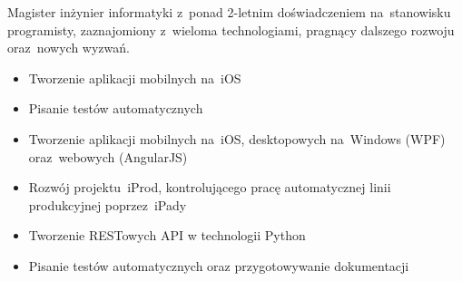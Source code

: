 \documentclass[11pt,a4paper]{article}
\begin{document}
    \bigskip

  
    \smallskip

    \noindent
    Magister inżynier informatyki z~ponad 2-letnim doświadczeniem na~stanowisku programisty, zaznajomiony z~wieloma technologiami, pragnący dalszego rozwoju oraz~nowych wyzwań.
  

    \bigskip


    \smallskip

    \vspace{-0.2cm}
    \begin{itemize} \itemsep1pt \parskip0pt 
        \item Tworzenie aplikacji mobilnych na~iOS
        \item Pisanie testów automatycznych
    \end{itemize}
    \vspace{-0.2cm}
    \vspace{-0.2cm}
    \begin{itemize} \itemsep1pt \parskip0pt 
        \item Tworzenie aplikacji mobilnych na~iOS, desktopowych na~Windows (WPF) oraz~webowych (AngularJS)
        \item Rozwój projektu~iProd, kontrolującego pracę automatycznej linii produkcyjnej poprzez~iPady
        \item Tworzenie RESTowych API w technologii Python
        \item Pisanie testów automatycznych oraz przygotowywanie dokumentacji
    \end{itemize}


    \medskip
  
  
    \smallskip
\end{document}
